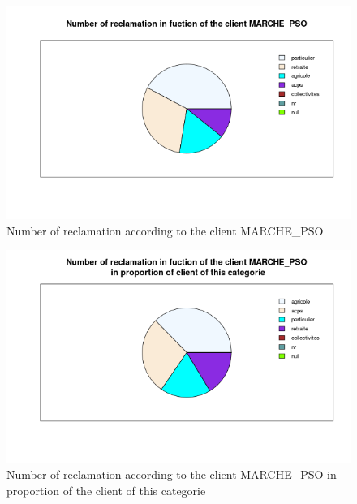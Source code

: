 \documentclass[a4paper, 11pt]{article}
\begin{document}
        \begin{figure}[!ht]
        	\centering
                \includegraphics[height = 10 cm]{Valentin/Number_of_reclamation_in_fuction_of_the_client_MARCHE_PSO.png}
                \caption{Number of reclamation according to the client MARCHE\_PSO}
                \label{fig:reclamtion_pso1}
        \end{figure}
        
        \begin{figure}[!ht]
        	\centering
                \includegraphics[height = 10 cm]{Valentin/Number_of_reclamation_in_fuction_of_the_client_MARCHE_PSO_proportion.png}
                \caption{Number of reclamation according to the client MARCHE\_PSO in proportion of the client of this categorie}
                \label{fig:reclamtion_pso2}
        \end{figure}
        
\end{document}
